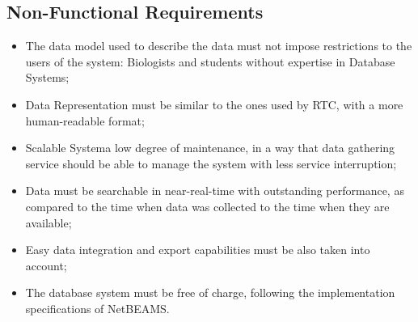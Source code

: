 \subsection{Non-Functional Requirements}

\begin{itemize}
  \item The data model used to describe the data must not impose restrictions
  to the users of the system: Biologists and students without expertise in
  Database Systems;
  \item Data Representation must be similar to the ones used by RTC, with a
  more human-readable format;
  \item Scalable Systema low degree of maintenance, in a way that data
  gathering service should be able to manage the system with less service interruption;
  \item Data must be searchable in near-real-time with outstanding performance,
  as compared to the time when data was collected to the time when they are available;
  \item Easy data integration and export capabilities must be also taken into
  account;
  \item The database system must be free of charge, following the
  implementation specifications of NetBEAMS.
\end{itemize}
